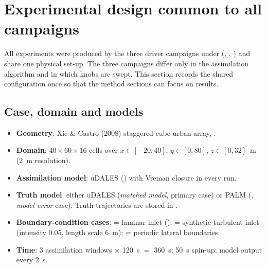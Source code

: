 \section{Experimental design common to all campaigns}
\label{sec:setup}

All experiments were produced by the three driver campaigns under
 (, ,
) and share one physical set-up. The three campaigns differ only
in the assimilation algorithm and in which knobs are swept. This section records the
shared configuration once so that the method sections can focus on results.

\subsection{Case, domain and models}
\begin{itemize}[nosep]
  \item \textbf{Geometry}: Xie \& Castro (2008) staggered-cube urban array,
        .
  \item \textbf{Domain}: $40\times60\times16$ cells over
        $x\in[-20,40]$, $y\in[0,80]$, $z\in[0,32]$~m (2~m resolution).
  \item \textbf{Assimilation model}: uDALES () with Vreman closure in every run.
  \item \textbf{Truth model}: either uDALES (\emph{matched model}, primary case) or PALM
        (, \emph{model-error} case). Truth trajectories are stored in
        .
  \item \textbf{Boundary-condition cases}:
         = laminar inlet ();
         = synthetic turbulent inlet (intensity 0.05, length scale 6~m);
         = periodic lateral boundaries.
  \item \textbf{Time}: 3 assimilation windows $\times$ 120~s $=$ 360~s; 50~s spin-up;
        model output every 2~s.
\end{itemize}


